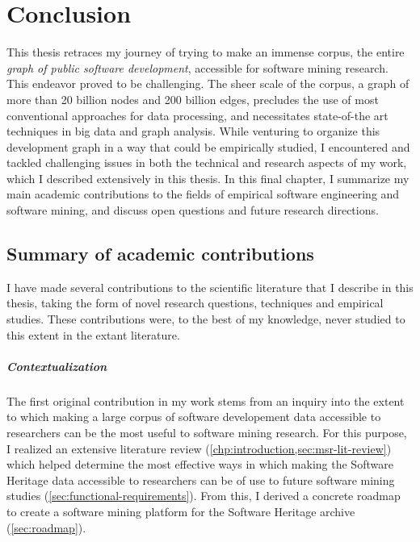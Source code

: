 \chapter{Conclusion}

This thesis retraces my journey of trying to make an immense corpus, the
entire \emph{graph of public software development}, accessible for software
mining research. This endeavor proved to be challenging. The sheer scale of the
corpus, a graph of more than 20 billion nodes and 200 billion edges, precludes
the use of most conventional approaches for data processing, and necessitates
state-of-the art techniques in big data and graph analysis.
While venturing to organize this development graph in a way that could be
empirically studied, I encountered and tackled challenging issues in both the
technical and research aspects of my work, which I described extensively in
this thesis. In this final chapter, I summarize my main academic contributions
to the fields of empirical software engineering and software mining, and
discuss open questions and future research directions.

\section{Summary of academic contributions}

I have made several contributions to the scientific literature that I describe
in this thesis, taking the form of novel research questions, techniques and
empirical studies. These contributions were, to the best of my knowledge, never
studied to this extent in the extant literature.

\paragraph*{Contextualization}

The first original contribution in my work stems from an inquiry into the
extent to which making a large corpus of software developement data accessible
to researchers can be the most useful to software mining research. For this
purpose, I realized an extensive literature review
(\cref{chp:introduction,sec:msr-lit-review}) which helped determine the most
effective ways in which making the Software Heritage data accessible to
researchers can be of use to future software mining studies
(\cref{sec:functional-requirements}). From this, I derived a concrete roadmap
to create a software mining platform for the Software Heritage archive
(\cref{sec:roadmap}).

